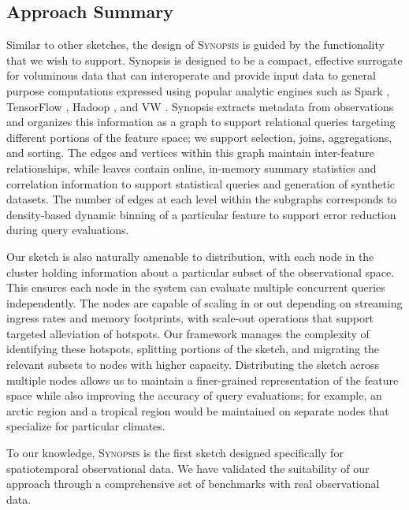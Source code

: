 \subsection{Approach Summary}
Similar to other sketches, the design of \textsc{Synopsis} is guided by the functionality that we wish to support. Synopsis is designed to be a compact, effective surrogate for voluminous data that can interoperate and provide input data to general purpose computations expressed using popular analytic engines such as Spark \cite{zaharia2010spark,armbrust2015spark}, TensorFlow \cite{abadi2016tensorflow,tensorflow}, Hadoop \cite{hadoop,shvachko2010hadoop,borthakur2008hdfs}, and VW \cite{langford2007vowpal}.   Synopsis extracts metadata from observations and organizes this information as a graph to support relational queries targeting different portions of the feature space; we support selection, joins, aggregations, and sorting. The edges and vertices within this graph maintain inter-feature relationships, while leaves contain online, in-memory summary statistics and correlation information to support statistical queries and generation of synthetic datasets.  The number of edges at each level within the subgraphs corresponds to density-based dynamic binning of a particular feature to support error reduction during query evaluations.

Our sketch is also naturally amenable to distribution, with each node in the cluster holding information about a particular subset of the observational space.  This ensures each node in the system can evaluate multiple concurrent queries independently. The nodes are capable of scaling in or out depending on streaming ingress rates and memory footprints, with scale-out operations that support targeted alleviation of hotspots. Our framework manages the complexity of identifying these hotspots, splitting portions of the sketch, and migrating the relevant subsets to nodes with higher capacity. Distributing the sketch across multiple nodes allows us to maintain a finer-grained representation of the feature space while also improving the accuracy of query evaluations; for example, an arctic region and a tropical region would be maintained on separate nodes that specialize for particular climates.

To our knowledge, \textsc{Synopsis} is the first sketch designed specifically for spatiotemporal observational data. We have validated the suitability of our approach through a comprehensive set of benchmarks with real observational data. 

